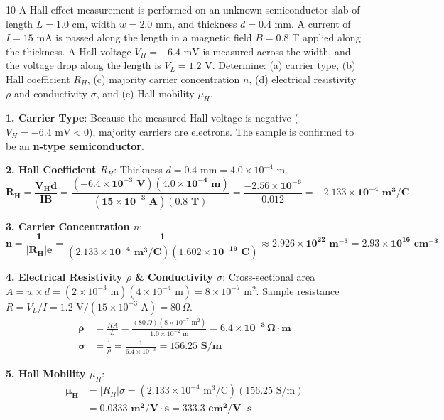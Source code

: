 \begin{theoryq}{10}
A Hall effect measurement is performed on an unknown semiconductor slab of length $L = 1.0\text{ cm}$, width $w = 2.0\text{ mm}$, and thickness $d = 0.4\text{ mm}$. A current of $I = 15\text{ mA}$ is passed along the length in a magnetic field $B = 0.8\text{ T}$ applied along the thickness. A Hall voltage $V_H = -6.4\text{ mV}$ is measured across the width, and the voltage drop along the length is $V_L = 1.2\text{ V}$. Determine: (a) carrier type, (b) Hall coefficient $R_H$, (c) majority carrier concentration $n$, (d) electrical resistivity $\rho$ and conductivity $\sigma$, and (e) Hall mobility $\mu_H$.
\end{theoryq}
\begin{theorysol}
\textbf{1. Carrier Type}:
Because the measured Hall voltage is negative ($V_H = -6.4\text{ mV} < 0$), majority carriers are electrons. The sample is confirmed to be an \textbf{n-type semiconductor}.

\textbf{2. Hall Coefficient $R_H$}:
Thickness $d = 0.4\text{ mm} = 4.0 \times 10^{-4}\text{ m}$.
\begin{equation}
\mathbf{R_H = \frac{V_H d}{I B} = \frac{(-6.4 \times 10^{-3}\text{ V})(4.0 \times 10^{-4}\text{ m})}{(15 \times 10^{-3}\text{ A})(0.8\text{ T})} = \frac{-2.56 \times 10^{-6}}{0.012} = -2.133 \times 10^{-4}\text{ m}^3/\text{C}}
\end{equation}

\textbf{3. Carrier Concentration $n$}:
\begin{equation}
\mathbf{n = \frac{1}{|R_H| e} = \frac{1}{(2.133 \times 10^{-4}\text{ m}^3/\text{C})(1.602 \times 10^{-19}\text{ C})} \approx 2.926 \times 10^{22}\text{ m}^{-3} = 2.93 \times 10^{16}\text{ cm}^{-3}}
\end{equation}

\textbf{4. Electrical Resistivity $\rho$ \& Conductivity $\sigma$}:
Cross-sectional area $A = w \times d = (2 \times 10^{-3}\text{ m})(4 \times 10^{-4}\text{ m}) = 8 \times 10^{-7}\text{ m}^2$.
Sample resistance $R = V_L / I = 1.2\text{ V} / (15 \times 10^{-3}\text{ A}) = 80\,\Omega$.
\begin{align*}
\mathbf{\rho} &= \frac{R A}{L} = \frac{(80\,\Omega)(8 \times 10^{-7}\text{ m}^2)}{1.0 \times 10^{-2}\text{ m}} = \mathbf{6.4 \times 10^{-3}\,\Omega\cdot\text{m}} \\
\mathbf{\sigma} &= \frac{1}{\rho} = \frac{1}{6.4 \times 10^{-3}} = \mathbf{156.25\text{ S/m}}
\end{align*}

\textbf{5. Hall Mobility $\mu_H$}:
\begin{align*}
\mathbf{\mu_H} &= |R_H| \sigma = (2.133 \times 10^{-4}\text{ m}^3/\text{C})(156.25\text{ S/m}) \\
&= \mathbf{0.0333\text{ m}^2/\text{V}\cdot\text{s} = 333.3\text{ cm}^2/\text{V}\cdot\text{s}}
\end{align*}
\end{theorysol}
\vspace{4mm}

